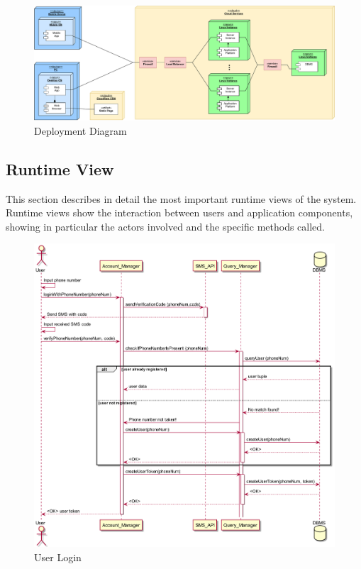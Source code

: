 \begin{figure}[H]
    \includegraphics[width=\linewidth]{images/draw.io/deployment_structure.pdf}
    \caption{Deployment Diagram}
    \label{fig:deployment_structure}
\end{figure}

\newpage

\subsection{Runtime View}
This section describes in detail the most important runtime views of the system. Runtime views show the interaction between users and application components, showing in particular the actors involved and the specific methods called.

\begin{figure}[H]
    \includegraphics[width=\linewidth]{uml/seq_user_login.png}
    \caption{User Login}
    \label{fig:seq_user_login}
\end{figure}

